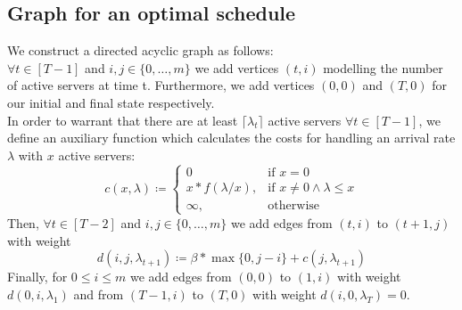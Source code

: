\documentclass[hidelinks]{article}
\theoremstyle{plain}
\theoremstyle{definition}
\theoremstyle{rem}
\begin{document}
\begin{sloppypar}
\subsection{Graph for an optimal schedule}\label{sec:optgraph}
We construct a directed acyclic graph as follows:\\
$\forall t\in[T-1]$ and $i,j\in\{0,\ldots,m\}$ we add vertices $(t,i)$ modelling the number of active servers at time t. Furthermore, we add vertices $(0,0)$ and $(T,0)$ for our initial and final state respectively.\\
In order to warrant that there are at least $\lceil\lambda_t\rceil$ active servers $\forall t\in[T-1]$, we define an auxiliary function which calculates the costs for handling an arrival rate $\lambda$ with $x$ active servers:
\begin{equation}
	c(x,\lambda)\coloneqq\begin{cases}
          0 & \text{if $x=0$}\\
	  x*f(\lambda/x), & \text{if $x\ne 0\wedge\lambda\le x$}\\
	  \infty, & \text{otherwise}
	  \end{cases} \label{fct:c}
\end{equation}
Then, $\forall t\in[T-2]$ and $i,j\in\{0,\ldots,m\}$ we add edges from $(t,i)$ to $(t+1,j)$ with weight
\begin{equation}
	d(i,j,\lambda_{t+1})\coloneqq\beta*\max\{0,j-i\}+c(j,\lambda_{t+1})
\end{equation}
Finally, for $0\le i\le m$ we add edges from $(0,0)$ to $(1,i)$ with weight $d(0,i,\lambda_1)$ and from $(T-1,i)$ to $(T,0)$ with weight $d(i,0,\lambda_T)=0$.
\begin{figure}[H]
\centering
{}
\end{figure}
\end{sloppypar}
\end{document}
